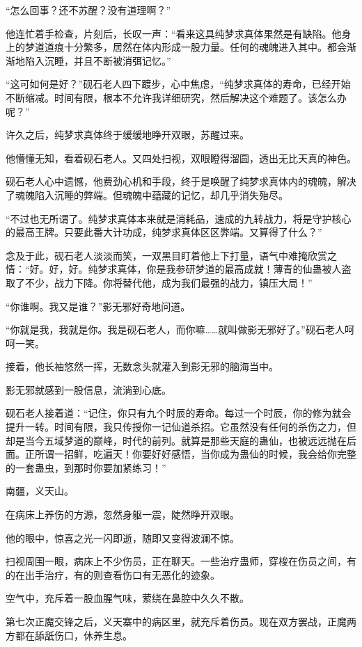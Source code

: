 \begin{this_body}
“怎么回事？还不苏醒？没有道理啊？”

他连忙着手检查，片刻后，长叹一声：“看来这具纯梦求真体果然是有缺陷。他身上的梦道道痕十分繁多，居然在体内形成一股力量。任何的魂魄进入其中。都会渐渐地陷入沉睡，并且不断被消弭记忆。”

“这可如何是好？”砚石老人四下踱步，心中焦虑，“纯梦求真体的寿命，已经开始不断缩减。时间有限，根本不允许我详细研究，然后解决这个难题了。该怎么办呢？”

许久之后，纯梦求真体终于缓缓地睁开双眼，苏醒过来。

他懵懂无知，看着砚石老人。又四处扫视，双眼瞪得溜圆，透出无比天真的神色。

砚石老人心中遗憾，他费劲心机和手段，终于是唤醒了纯梦求真体内的魂魄，解决了魂魄陷入沉睡的弊端。但魂魄中蕴藏的记忆，却几乎消失殆尽。

“不过也无所谓了。纯梦求真体本来就是消耗品，速成的九转战力，将是守护核心的最高王牌。只要此番大计功成，纯梦求真体区区弊端。又算得了什么？”

念及于此，砚石老人淡淡而笑，一双黑目盯着他上下打量，语气中难掩欣赏之情：“好。好，好。纯梦求真体，你是我参研梦道的最高成就！薄青的仙蛊被人盗取了不少，战力下降。你将替代他，成为我们最强的战力，镇压大局！”

“你谁啊。我又是谁？”影无邪好奇地问道。

“你就是我，我就是你。我是砚石老人，而你嘛……就叫做影无邪好了。”砚石老人呵呵一笑。

接着，他长袖悠然一挥，无数念头就灌入到影无邪的脑海当中。

影无邪就感到一股信息，流淌到心底。

砚石老人接着道：“记住，你只有九个时辰的寿命。每过一个时辰，你的修为就会提升一转。时间有限，我只传授你一记仙道杀招。它虽然没有任何的杀伤之力，但却是当今五域梦道的巅峰，时代的前列。就算是那些天庭的蛊仙，也被远远抛在后面。正所谓一招鲜，吃遍天！你要好好感悟，当你成为蛊仙的时候，我会给你完整的一套蛊虫，到那时你要加紧练习！”

南疆，义天山。

在病床上养伤的方源，忽然身躯一震，陡然睁开双眼。

他的眼中，惊喜之光一闪即逝，随即又变得波澜不惊。

扫视周围一眼，病床上不少伤员，正在聊天。一些治疗蛊师，穿梭在伤员之间，有的在出手治疗，有的则查看伤口有无恶化的迹象。

空气中，充斥着一股血腥气味，萦绕在鼻腔中久久不散。

第七次正魔交锋之后，义天寨中的病区里，就充斥着伤员。现在双方罢战，正魔两方都在舔舐伤口，休养生息。


\end{this_body}
